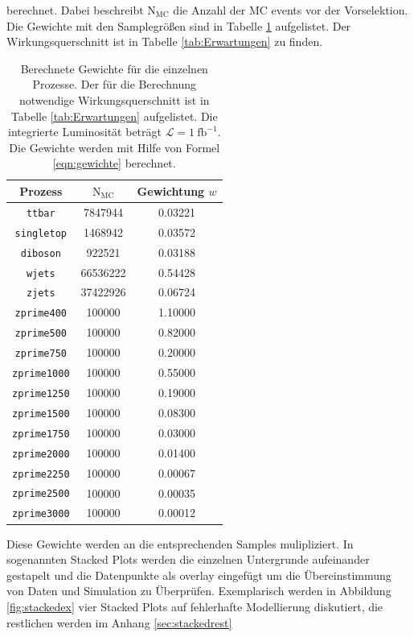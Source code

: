 berechnet. Dabei beschreibt $\text{N}_\text{MC}$ die Anzahl der MC events vor der 
Vorselektion. Die Gewichte mit den Samplegrößen sind in Tabelle 
\ref{tab:Gewichte} aufgelistet. Der Wirkungsquerschnitt ist in Tabelle 
\ref{tab:Erwartungen} zu finden. 

\begin{table}[H]
    \centering
    \caption{Berechnete Gewichte für die einzelnen Prozesse. Der für die Berechnung notwendige 
    Wirkungsquerschnitt ist in Tabelle \ref{tab:Erwartungen} aufgelistet. Die integrierte 
    Luminosität beträgt $\mathcal{L} = \SI{1}{\femto\barn}^{-1}$. Die Gewichte werden mit 
    Hilfe von Formel \eqref{eqn:gewichte} berechnet.}
    \label{tab:Gewichte}
    \begin{tabular}{c|cc}
    \toprule 
    Prozess & $\text{N}_\text{MC}$ & Gewichtung $w$ \\
    \midrule
    \texttt{ttbar}      & 7847944    & 0.03221     \\
    \texttt{singletop}  & 1468942    & 0.03572     \\
    \texttt{diboson}    & 922521     & 0.03188     \\
    \texttt{wjets}      & 66536222   & 0.54428     \\
    \texttt{zjets}      & 37422926   & 0.06724     \\
    \texttt{zprime400}  & 100000     & 1.10000     \\
    \texttt{zprime500}  & 100000     & 0.82000     \\
    \texttt{zprime750}  & 100000     & 0.20000     \\
    \texttt{zprime1000} & 100000     & 0.55000     \\
    \texttt{zprime1250} & 100000     & 0.19000     \\
    \texttt{zprime1500} & 100000     & 0.08300     \\
    \texttt{zprime1750} & 100000     & 0.03000     \\
    \texttt{zprime2000} & 100000     & 0.01400     \\
    \texttt{zprime2250} & 100000     & 0.00067     \\
    \texttt{zprime2500} & 100000     & 0.00035     \\
    \texttt{zprime3000} & 100000     & 0.00012     \\
    \bottomrule 
    \end{tabular}
\end{table}

Diese Gewichte werden an die entsprechenden Samples mulipliziert. In sogenannten 
Stacked Plots werden die einzelnen Untergrunde aufeinander gestapelt und 
die Datenpunkte als overlay eingefügt um die Übereinstimmung von Daten und 
Simulation zu Überprüfen. Exemplarisch werden in 
Abbildung \ref{fig:stackedex} vier Stacked Plots auf 
fehlerhafte Modellierung diskutiert, die restlichen werden im Anhang \ref{sec:stackedrest}
 
